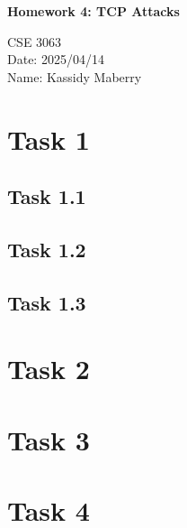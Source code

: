 \documentclass[12pt]{article}
\newcommand{\PLtitle}{\setlength{\parindent}{0pt}
\begin{center}

  \huge{\textbf{Homework \Lab: \Ltitle\\}}
  \normalsize 

  CSE 3063 \\
  Date: \date\\
  Name: \author\\
  


\end{center}
}
\def\Lab{4}
\def\Ltitle{TCP Attacks}
\def\author{Kassidy Maberry}
\def\date{2025/04/14}
\begin{document}
\PLtitle

\section*{Task 1}

\subsection*{Task 1.1}

\subsection*{Task 1.2}

\subsection*{Task 1.3}

\section*{Task 2}

\section*{Task 3}

\section*{Task 4}
\end{document}
